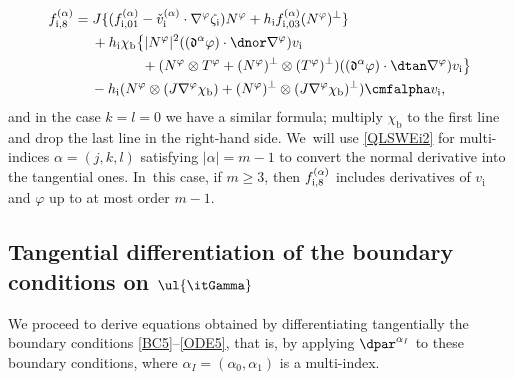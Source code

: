 \begin{align*}
f_{{\rm i},8}^{(\alpha)}
&= J \{ (f_{{\rm i}, 01}^{(\alpha)} - \check{v}_\mathrm{i}^{(\alpha)}\cdot\nabla^\varphi\zeta_\mathrm{i})N^\varphi
+ h_\mathrm{i}f_{{\rm i},03}^{(\alpha)}(N^\varphi)^\perp \} \\
&\quad\;
+ h_\mathrm{i}\chi_\mathrm{b} \big\{ |N^\varphi|^2((\mathfrak{d}^\alpha\varphi)\cdot\dnor\nabla^\varphi)v_\mathrm{i} \\
&\hspace{1.7cm} + (N^\varphi\otimes T^\varphi + (N^\varphi)^\perp\otimes(T^\varphi)^\perp)((\mathfrak{d}^\alpha\varphi)\cdot\dtan\nabla^\varphi)v_\mathrm{i} \big\} \\
&\quad\:
- h_\mathrm{i}(N^\varphi\otimes(J\nabla^\varphi\chi_\mathrm{b}) + (N^\varphi)^\perp\otimes(J\nabla^\varphi\chi_\mathrm{b})^\perp) \cmfalpha v_\mathrm{i},
\end{align*}
and in the case $k=l=0$ we have a similar formula; multiply $\chi_\mathrm{b}$ to the first line and drop the last line in the right-hand side. We~will use \eqref{QLSWEi2} for multi-indices $\alpha=(j,k,l)$ satisfying $|\alpha|=m-1$ to convert the normal derivative into the tangential ones. In~this case, if $m\geq3$, then $f_{{\rm i},8}^{(\alpha)}$ includes derivatives of $v_\mathrm{i}$ and $\varphi$ up to at most order $m-1$.

\Changelback

\subsection{Tangential differentiation of the boundary conditions on $\ul{\itGamma}$}\label{secttangdiff}
We proceed to derive equations obtained by differentiating tangentially the boundary conditions \eqref{BC5}--\eqref{ODE5},
that is, by applying $\dpar^{\alpha_I}$ to these boundary conditions, where $\alpha_I=(\alpha_0,\alpha_1)$ is a multi-index.

